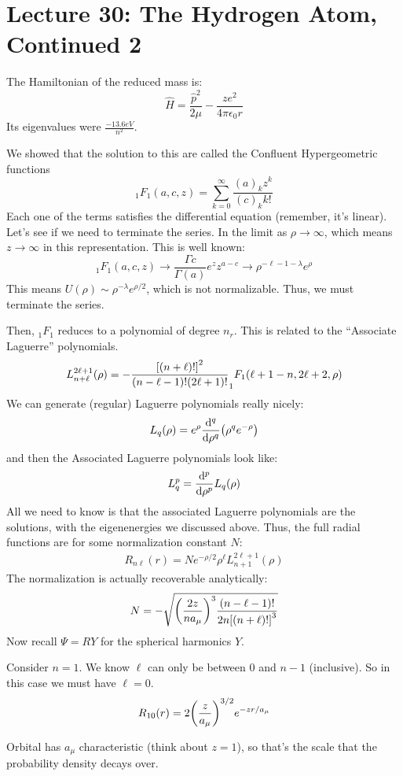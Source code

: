 \section{Lecture 30: The Hydrogen Atom, Continued 2}

The Hamiltonian of the reduced mass is:
\[ \hat{H} = \frac{\hat{p}^2}{2\mu} - \frac{ze^2}{4 \pi \epsilon_0 r} \]
Its eigenvalues were $\frac{-13.6 eV}{n^2}$.

We showed that the solution to this are called the Confluent Hypergeometric functions 
\[ _1F_1(a, c, z) = \sum_{k = 0}^{\infty} \frac{(a)_k z^k}{(c)_k k!}\]
Each one of the terms satisfies the differential equation (remember, it's linear). Let's see if
we need to terminate the series. In the limit as $\rho \to \infty$, which means $z \to \infty$ in this representation.
This is well known:
\[ _1F_1(a, c, z) \to \frac{\Gamma{c}}{\Gamma(a)} e^z z^{a - c} \to \rho^{-\ell - 1 - \lambda} e^{\rho} \]
This means $U(\rho) \sim \rho^{-\lambda} e^{\rho/2}$, which is not normalizable. Thus, we must terminate the series.

Then, $_1F_1$ reduces to a polynomial of degree $n_r$. This is related to the ``Associate Laguerre'' polynomials.
\[ L_{n + \ell}^{2\ell + 1}(\rho) = - \frac{\qty[(n + \ell)!]^2}{(n - \ell - 1)! (2\ell + 1)!} _1F_1(\ell + 1 - n, 2\ell + 2, \rho) \]
We can generate (regular) Laguerre polynomials really nicely:
\[ L_q(\rho) = e^{\rho} \dv{^q}{\rho^q} \qty(\rho^q e^{-\rho}) \]
and then the Associated Laguerre polynomials look like:
\[ L_q^p = \dv{^p}{\rho^p} L_q(\rho) \]
All we need to know is that the associated Laguerre polynomials are the solutions, with the eigenenergies we discussed above.
Thus, the full radial functions are for some normalization constant $N$:
\begin{align*}
    R_{n \ell}(r) = N e^{-\rho/2} \rho^{\ell} L_{n + 1}^{2\ell + 1}(\rho)
\end{align*}
The normalization is actually recoverable analytically:
\[ N = - \sqrt{\qty(\frac{2z}{n a_{\mu}})^3 \frac{(n - \ell - 1)!}{2n \qty[(n + \ell)!]^3}} \]
Now recall $\Psi = RY$ for the spherical harmonics $Y$. 

Consider $n = 1$. We know $\ell$ can only be between $0$ and $n - 1$ (inclusive). So in this case we must have $\ell = 0$.
\[ R_{10}(r) = 2 \qty(\frac{z}{a_{\mu}})^{3/2} e^{-zr/{a_{\mu}}} \]

Orbital has $a_{\mu}$ characteristic (think about $z = 1$), so that's the scale that the probability density decays over.

